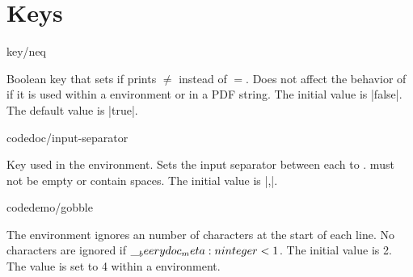 \documentclass{beerydoc}
\begin{document}
\section{Keys}
\label{sec:keys}

\begin{codedoc}{key/neq}
  \begin{syntax}
  \end{syntax}
  Boolean key that sets if  prints $\neq $ instead of $=$.
  Does not affect the behavior of  if it is used within a 
  environment or in a PDF string.
  The initial value is |false|.
  The default value is |true|.
\end{codedoc}

\begin{codedoc}{codedoc/input-separator}
  \begin{syntax}
  \end{syntax}
  Key used in the  environment.
  Sets the input separator between each  to .
   must not be empty or contain spaces.
  The initial value is |,|.
\end{codedoc}

\begin{codedoc}{codedemo/gobble}
  \begin{syntax}
  \end{syntax}
  The  environment ignores an  number of characters
  at the start of each line.
  No characters are ignored if $\__beerydoc_meta:n {integer}<1$.
  The initial value is \num{2}.
  The value is set to \num{4} within a  environment.
\end{codedoc}
\end{document}
